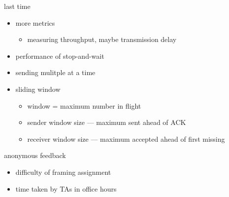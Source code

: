 \date{}
\title{}
\date{}
\usepackage{pgfplots}
\pgfplotsset{compat=1.16}

\begin{frame}
    \titlepage
\end{frame}

\begin{frame}{last time}
    \begin{itemize}
    \item more metrics
        \begin{itemize}
        \item measuring throughput, maybe transmission delay
        \end{itemize}
    \item performance of stop-and-wait
    \item sending mulitple at a time
    \item sliding window
        \begin{itemize}
        \item window = maximum number in flight
        \item sender window size --- maximum sent ahead of ACK
        \item receiver window size --- maximum accepted ahead of first missing
        \end{itemize}
    \end{itemize}
\end{frame}

\begin{frame}{anonymous feedback}
    \begin{itemize}
    \item difficulty of framing assignment 
    \item time taken by TAs in office hours
    \end{itemize}
\end{frame}

